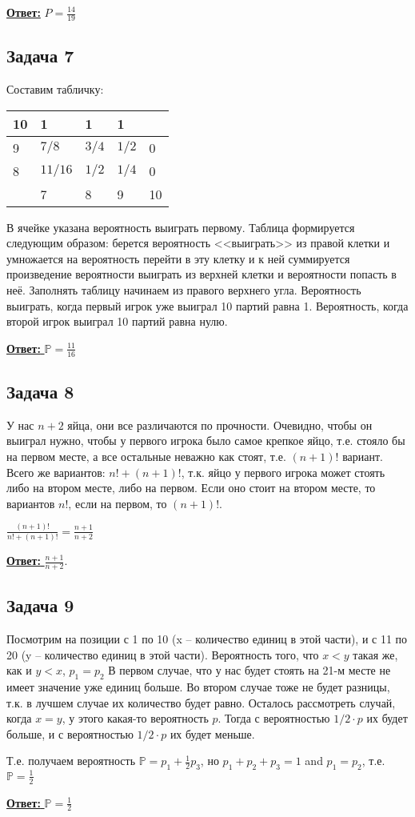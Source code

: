 \documentclass[a4paper,14pt]{article} %
\begin{document}
\underline{\textbf{Ответ:}} $P = \frac{14}{19}$

\subsection{Задача 7}
Составим табличку:
\begin{table}[H]
	\begin{tabular}{|l|l|l|l|l|}
	\hline
	10 & 1     		& 1   & 1   &    \\ \hline
	9  & $7/8  $ 	& $3 /4$ & $1/2$ & 0  \\ \hline
	8  & $11/16$ 	& $1 /2$ & $1/4$ & 0  \\ \hline
	   & 7     		& 8   & 9   & 10 \\ \hline
	\end{tabular}
\end{table}
В ячейке указана вероятность выиграть первому.
Таблица формируется следующим образом: берется вероятность <<выиграть>> из правой клетки и умножается на вероятность перейти в эту клетку и к ней суммируется произведение вероятности выиграть из верхней клетки и вероятности попасть в неё.
Заполнять таблицу начинаем из правого верхнего угла. Вероятность выиграть, когда первый игрок уже выиграл 10 партий равна 1. Вероятность, когда второй игрок выиграл 10 партий равна нулю.

\underline{\textbf{Ответ: }} $\mathds{P} = \frac{11}{16}$

\subsection{Задача 8}
У нас $n + 2$ яйца, они все различаются по прочности. Очевидно, чтобы он выиграл нужно, чтобы у первого игрока было самое крепкое яйцо, т.е. стояло бы на первом месте, а все остальные неважно как стоят, т.е. $(n+1)!$ вариант.
Всего же вариантов: $n! + (n+1)!$, т.к. яйцо у первого игрока может стоять либо на втором месте, либо на первом. Если оно стоит на втором месте, то вариантов $n!$, если на первом, то $(n+1)!$.

$\frac{(n+1)!}{n! + (n+1)!} = \frac{n+1}{n+2}$

\underline{\textbf{Ответ: }} $\frac{n+1}{n+2}$.

\subsection{Задача 9}
Посмотрим на позиции с 1 по 10 (x -- количество единиц в этой части), и с 11 по 20 (y -- количество единиц в этой части). 
Вероятность того, что $x < y$ такая же, как и $y < x$, $p_1 = p_2$
В первом случае, что у нас будет стоять на 21-м месте не имеет значение уже единиц больше. Во втором случае тоже не будет разницы, т.к. в лучшем случае их количество будет равно.
Осталось рассмотреть случай, когда $x = y$, у этого какая-то вероятность $p$. Тогда с вероятностью $1/2 \cdot p$ их будет больше, и с вероятностью $1/2 \cdot p$ их будет меньше.

Т.е. получаем вероятность $\mathds{P} = p_1 + \frac{1}{2} p_3$, но $p_1 + p_2 + p_3 = 1$ and $p_1 = p_2$, 
\newline
т.е. $\mathds{P} = \frac{1}{2}$

\underline{\textbf{Ответ: }} $\mathds{P} = \frac{1}{2}$
\end{document}
